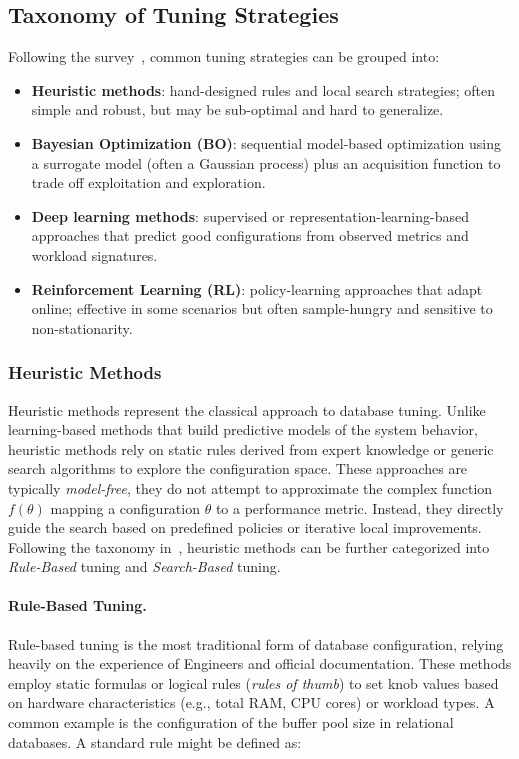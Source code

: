 \subsection{Taxonomy of Tuning Strategies}\label{sec:bg-tuning-taxonomy}

Following the survey~\cite{autotune_survey}, common tuning strategies can be grouped into:
\begin{itemize}
    \item \textbf{Heuristic methods}: hand-designed rules and local search strategies; often simple and robust, but may be sub-optimal and hard to generalize.
    \item \textbf{Bayesian Optimization (BO)}: sequential model-based optimization using a surrogate model (often a Gaussian process) plus an acquisition function to trade off exploitation and exploration.
    \item \textbf{Deep learning methods}: supervised or representation-learning-based approaches that predict good configurations from observed metrics and workload signatures.
    \item \textbf{Reinforcement Learning (RL)}: policy-learning approaches that adapt online; effective in some scenarios but often sample-hungry and sensitive to non-stationarity.
\end{itemize}

\subsubsection{Heuristic Methods}

Heuristic methods represent the classical approach to database tuning. Unlike learning-based methods that build predictive models of the system behavior, heuristic methods rely on static rules derived from expert knowledge or generic search algorithms to explore the configuration space.
These approaches are typically \textit{model-free}, they do not attempt to approximate the complex function $f(\theta)$ mapping a configuration $\theta$ to a performance metric.
Instead, they directly guide the search based on predefined policies or iterative local improvements.
Following the taxonomy in~\cite{autotune_survey}, heuristic methods can be further categorized into \textit{Rule-Based} tuning and \textit{Search-Based} tuning.

\paragraph{Rule-Based Tuning.} 
Rule-based tuning is the most traditional form of database configuration, relying heavily on the experience of Engineers and official documentation.
These methods employ static formulas or logical rules (\textit{rules of thumb}) to set knob values based on hardware characteristics (e.g., total RAM, CPU cores) or workload types.
A common example is the configuration of the buffer pool size in relational databases. A standard rule might be defined as:

